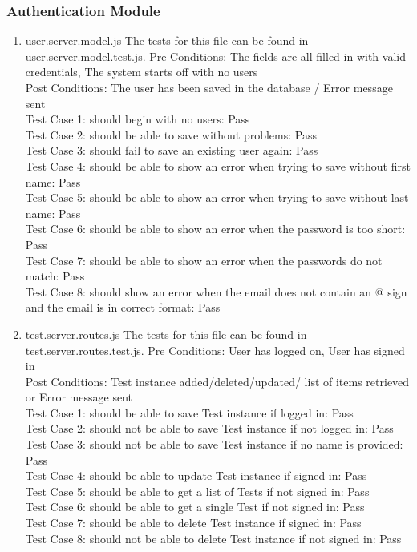 \documentclass[a4paper,12pt]{report}
\begin{document}
\subsubsection{Authentication Module }
\begin{enumerate}
\item user.server.model.js
The tests for this file can be found in user.server.model.test.js.
Pre Conditions: The fields are all filled in with valid credentials, The system starts off with no users \\
Post Conditions: The user has been saved in the database /  Error message sent\\ 
Test Case 1: should begin with no users: Pass\\
Test Case 2: should be able to save without problems: Pass\\
Test Case 3: should fail to save an existing user again: Pass\\
Test Case 4: should be able to show an error when trying to save without first name: Pass\\
Test Case 5: should be able to show an error when trying to save without last name: Pass\\
Test Case 6: should be able to show an error when the password is too short: Pass\\
Test Case 7: should be able to show an error when the passwords do not match: Pass\\
Test Case 8: should show an error when the email does not contain an @ sign and the email is in correct format: Pass\\

\item test.server.routes.js
The tests for this file can be found in test.server.routes.test.js.
Pre Conditions: User has logged on, User has signed in\\
Post Conditions: Test instance added/deleted/updated/ list of items retrieved or Error message sent \\
Test Case 1: should be able to save Test instance if logged in: Pass\\
Test Case 2: should not be able to save Test instance if not logged in: Pass\\
Test Case 3: should not be able to save Test instance if no name is provided: Pass\\
Test Case 4: should be able to update Test instance if signed in: Pass\\
Test Case 5: should be able to get a list of Tests if not signed in: Pass\\
Test Case 6: should be able to get a single Test if not signed in: Pass\\
Test Case 7: should be able to delete Test instance if signed in: Pass\\
Test Case 8: should not be able to delete Test instance if not signed in: Pass
\end{enumerate}
\end{document}
